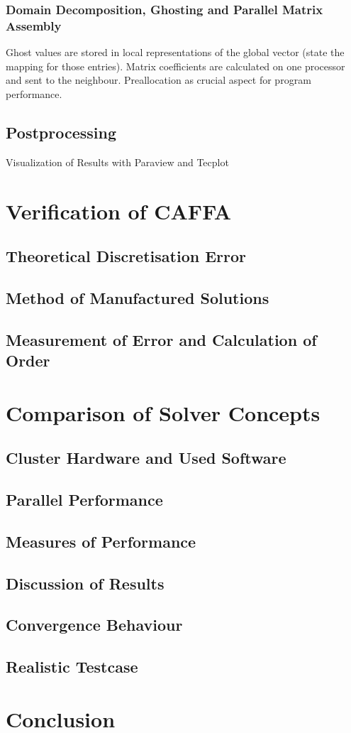 \documentclass[article,type=msc,colorback,accentcolor=tud2a]{tudthesis}
\begin{document}
      \subsubsection{Domain Decomposition, Ghosting and Parallel Matrix Assembly}

        Ghost values are stored in local representations of the global vector (state the mapping for those entries). Matrix coefficients are calculated on one processor and sent to the neighbour. Preallocation as crucial aspect for program performance.

    \subsection{Postprocessing}
    
      Visualization of Results with Paraview and Tecplot

  \section{Verification of CAFFA}

    \subsection{Theoretical Discretisation Error}
    \subsection{Method of Manufactured Solutions}
    \subsection{Measurement of Error and Calculation of Order}

  \section{Comparison of Solver Concepts}

    \subsection{Cluster Hardware and Used Software}
    \subsection{Parallel Performance}

      \subsection{Measures of Performance}
      \subsection{Discussion of Results}

    \subsection{Convergence Behaviour}
    \subsection{Realistic Testcase}

  \section{Conclusion}
\end{document}
